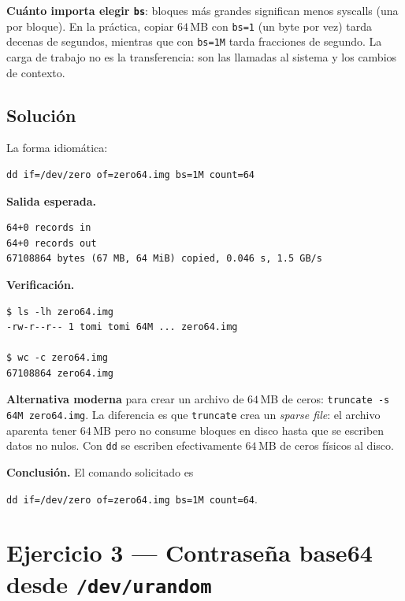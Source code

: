 \documentclass[11pt,a4paper]{article}
\begin{document}
\begin{idea}
\textbf{Cuánto importa elegir \texttt{bs}}: bloques más grandes
significan menos syscalls (una por bloque). En la práctica, copiar
$64$\,MB con \texttt{bs=1} (un byte por vez) tarda decenas de
segundos, mientras que con \texttt{bs=1M} tarda fracciones de segundo.
La carga de trabajo no es la transferencia: son las llamadas al
sistema y los cambios de contexto.
\end{idea}

\subsection*{Solución}

La forma idiomática:

\begin{lstlisting}[style=shellstyle]
dd if=/dev/zero of=zero64.img bs=1M count=64
\end{lstlisting}

\textbf{Salida esperada.}

\begin{lstlisting}[style=textstyle]
64+0 records in
64+0 records out
67108864 bytes (67 MB, 64 MiB) copied, 0.046 s, 1.5 GB/s
\end{lstlisting}

\textbf{Verificación.}

\begin{lstlisting}[style=shellstyle]
$ ls -lh zero64.img
-rw-r--r-- 1 tomi tomi 64M ... zero64.img

$ wc -c zero64.img
67108864 zero64.img
\end{lstlisting}

\begin{importante}
\textbf{Alternativa moderna} para crear un archivo de $64$\,MB de
ceros: \verb|truncate -s 64M zero64.img|. La diferencia es que
\texttt{truncate} crea un \emph{sparse file}: el archivo aparenta tener
$64$\,MB pero no consume bloques en disco hasta que se escriben datos
no nulos. Con \texttt{dd} se escriben efectivamente $64$\,MB de ceros
físicos al disco.
\end{importante}

\textbf{Conclusión.} El comando solicitado es

\verb|dd if=/dev/zero of=zero64.img bs=1M count=64|.

\section{Ejercicio 3 --- Contraseña base64 desde \texttt{/dev/urandom}}
\end{document}
